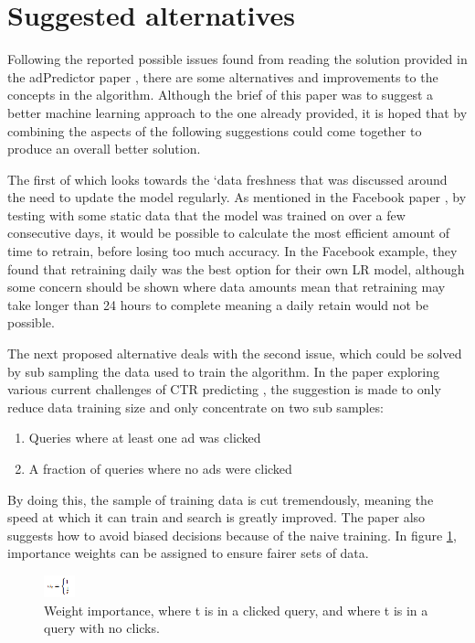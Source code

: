 \documentclass[journal]{IEEEtran}
\begin{document}
\section{Suggested alternatives}
Following the reported possible issues found from reading the solution provided in the adPredictor paper \cite{bing-paper}, there are some alternatives and improvements to the concepts in the algorithm. Although the brief of this paper was to suggest a better machine learning approach to the one already provided, it is hoped that by combining the aspects of the following suggestions could come together to produce an overall better solution. \par
The first of which looks towards the ‘data freshness that was discussed around the need to update the model regularly. As mentioned in the Facebook paper \cite{facebook}, by testing with some static data that the model was trained on over a few consecutive days, it would be possible to calculate the most efficient amount of time to retrain, before losing too much accuracy. In the Facebook example, they found that retraining daily was the best option for their own LR model, although some concern should be shown where data amounts mean that retraining may take longer than 24 hours to complete meaning a daily retain would not be possible. \par
The next proposed alternative deals with the second issue, which could be solved by sub sampling the data used to train the algorithm. In the paper exploring various current challenges of CTR predicting \cite{trenches}, the suggestion is made to only reduce data training size and only concentrate on two sub samples:
\begin{enumerate}
\item Queries where at least one ad was clicked
\item A fraction of queries where no ads were clicked
\end{enumerate}
By doing this, the sample of training data is cut tremendously, meaning the speed at which it can train and search is greatly improved. The paper also suggests how to avoid biased decisions because of the naive training. In figure \ref{fig:importance}, importance weights can be assigned to ensure fairer sets of data.
\begin{figure}[!ht]
  \caption{Weight importance, where t is in a clicked query, and where t is in a query with no clicks.}
  \centering
  \label{fig:importance}
    \includegraphics[width=0.08\textwidth]{importance}
\end{figure}
\end{document}

